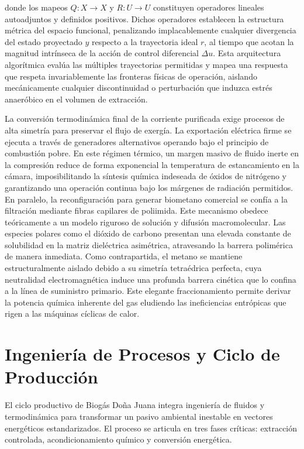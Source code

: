 \documentclass[11pt,letterpaper]{article}
\begin{document}
donde los mapeos $Q : X \to X$ y $R : U \to U$ constituyen operadores
lineales autoadjuntos y definidos positivos. Dichos operadores establecen
la estructura métrica del espacio funcional, penalizando implacablemente
cualquier divergencia del estado proyectado $y$ respecto a la trayectoria
ideal $r$, al tiempo que acotan la magnitud intrínseca de la acción de
control diferencial $\Delta u$. Esta arquitectura algorítmica evalúa las
múltiples trayectorias permitidas y mapea una respuesta que respeta
invariablemente las fronteras físicas de operación, aislando mecánicamente
cualquier discontinuidad o perturbación que induzca estrés anaeróbico en el
volumen de extracción.

La conversión termodinámica final de la corriente purificada exige procesos
de alta simetría para preservar el flujo de exergía. La exportación eléctrica
firme se ejecuta a través de generadores alternativos operando bajo el
principio de combustión pobre. En este régimen térmico, un margen masivo de
fluido inerte en la compresión reduce de forma exponencial la temperatura de
estancamiento en la cámara, imposibilitando la síntesis química indeseada de
óxidos de nitrógeno y garantizando una operación continua bajo los márgenes
de radiación permitidos. En paralelo, la reconfiguración para generar
biometano comercial se confía a la filtración mediante fibras capilares de
poliimida. Este mecanismo obedece teóricamente a un modelo riguroso de
solución y difusión macromolecular. Las especies polares como el dióxido de
carbono presentan una elevada constante de solubilidad en la matriz
dieléctrica asimétrica, atravesando la barrera polimérica de manera
inmediata. Como contrapartida, el metano se mantiene estructuralmente
aislado debido a su simetría tetraédrica perfecta, cuya neutralidad
electromagnética induce una profunda barrera cinética que lo confina a la
línea de suministro primario. Este elegante fraccionamiento permite derivar
la potencia química inherente del gas eludiendo las ineficiencias entrópicas
que rigen a las máquinas cíclicas de calor.

\newpage

\section{Ingeniería de Procesos y Ciclo de Producción}

El ciclo productivo de Biogás Doña Juana integra ingeniería de fluidos y
termodinámica para transformar un pasivo ambiental inestable en vectores
energéticos estandarizados. El proceso se articula en tres fases críticas:
extracción controlada, acondicionamiento químico y conversión energética.
\end{document}
